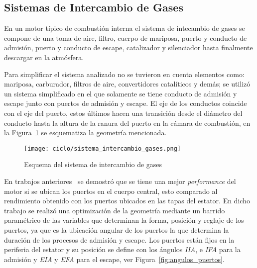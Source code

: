 

\subsection{Sistemas de Intercambio de Gases}
%
En un motor típico de combustión interna el sistema de intecambio de gases se
compone de una toma de aire, filtro, cuerpo de mariposa, puerto y conducto de
admisión, puerto y conducto de escape, catalizador y silenciador hasta
finalmente descargar en la atmósfera.

Para simplificar el sistema analizado no se tuvieron en cuenta elementos como:
mariposa, carburador, filtros de aire, convertidores catalíticos y demás; se
utilizó un sistema simplificado en el que solamente se tiene conducto de
admisión y escape junto con puertos de admisión y escape.
%
El eje de los conductos coincide con el eje del puerto, estos últimos hacen una
transición desde el diámetro del conducto hasta la altura de la ranura del
puerto en la cámara de combustión, en la
Figura~\ref{fig:sistema_intercambio_gases} se esquematiza la geometría
mencionada.

\begin{figure}
    \centering
    \texttt{[image: ciclo/sistema\_intercambio\_gases.png]}
    \caption{Esquema del sistema de intercambio de gases}\label{fig:sistema_intercambio_gases}
\end{figure}


En trabajos anteriores~\parencite{lopez13} se demostró que se tiene una mejor
\emph{performance} del motor si se ubican los puertos en el cuerpo central, esto
comparado al rendimiento obtenido con los puertos ubicados en las tapas del
estator.
%
En dicho trabajo se realizó una optimización de la geometría mediante un barrido
paramétrico de las variables que determinan la forma, posición y reglaje de los
puertos, ya que es la ubicación angular de los puertos la que determina la
duración de los procesos de admisión y escape.
%
%
Los puertos están fijos en la periferia del estator y su posición se define con
los ángulos \emph{IIA}, e \emph{IFA} para la admisión y \emph{EIA} y \emph{EFA}
para el escape, ver Figura~\ref{fig:angulos_puertos}.

